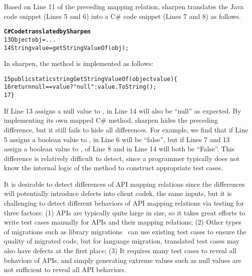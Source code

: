 Based on Line 11 of the preceding mapping relation, sharpen translates the Java code snippet (Lines 5 and 6) into a C\# code snippet (Lines 7 and 8) as follows.

\begin{CodeOut}%
\begin{alltt}
\textbf{  C# Code translated by Sharpen}
13 Object obj = ...
14 String value = getStringValueOf(obj);
\end{alltt}
\end{CodeOut}

In sharpen, the  method is implemented as follows:

\begin{CodeOut}%
\begin{alltt}
15 public static string GetStringValueOf(object value)\{
16  return null == value? "null": value.ToString();
17	\}
\end{alltt}
\end{CodeOut}

If Line 13 assigns a null value to ,  in Line 14 will also be ``null'' as expected. By implementing its own mapped C\# method, sharpen hides the preceding difference, but it still fails to hide all differences. For example, we find that if Line 5 assigns a  boolean value to ,  in Line 6 will be ``false'', but if Lines 7 and 13 assign a  boolean value to ,  of Line 8 and  in Line 14 will both be ``False''. This difference is relatively difficult to detect, since a programmer typically does not know the internal logic of the method to construct appropriate test cases.


It is desirable to detect differences of API mapping relations since the differences will potentially introduce defects into client codek, the same inputs, but it is challenging to detect different behaviors of API mapping relations via testing for three factors: (1) APIs are typically quite large in size, so it takes great efforts to write test cases manually for APIs and their mapping relations; (2) Other types of migrations such as library migrations~\cite{nita2010using} can use existing test cases to ensure the quality of migrated code, but for language migration, translated test cases may also have defects at the first place; (3) It requires many test cases to reveal all behaviors of APIs, and simply generating extreme values such as null values are not sufficient to reveal all API behaviors.

